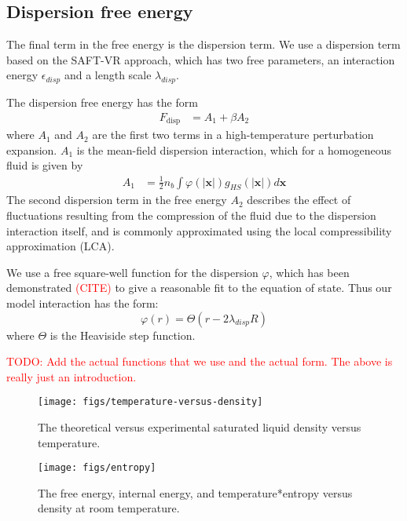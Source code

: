 \documentclass[letterpaper,twocolumn,amsmath,amssymb,prb]{revtex4-1}
\newcommand{\xx}{\textbf{x}}
\begin{document}
\subsection{Dispersion free energy}
The final term in the free energy is the dispersion term.  We use a
dispersion term based on the SAFT-VR
approach\cite{gil-villegas-1997-SAFT-VR}, which has two free
parameters, an interaction energy $\epsilon_\textit{disp}$ and a
length scale $\lambda_\textit{disp}$.

The dispersion free energy has the form~\cite{gil-villegas-1997-SAFT-VR}
\begin{align}
  F_\text{disp} &= A_1 + \beta A_2
\end{align}
where $A_1$ and $A_2$ are the first two terms in a high-temperature
perturbation expansion.  $A_1$ is the mean-field dispersion
interaction, which for a homogeneous fluid is given by
\begin{align}
  A_1 &= \frac12 n_b \int \varphi(\left|\xx\right|)
  g_{HS}(\left|\xx\right|) d\xx
\end{align}
The second dispersion term in the free energy $A_2$ describes the
effect of fluctuations resulting from the compression of the fluid due
to the dispersion interaction itself, and is commonly approximated
using the local compressibility approximation (LCA).

We use a free square-well function for the dispersion $\varphi$, which
has been demonstrated \textcolor{red}{(CITE)} to give a reasonable fit
to the equation of state.  Thus our model interaction has the form:
\begin{equation}
  \varphi(r) = \Theta(r-2 \lambda_\textit{disp} R)
\end{equation}
where $\Theta$ is the Heaviside step function.

\textcolor{red}{TODO:  Add the actual functions that we use and the
  actual form.  The above is really just an introduction.}


\begin{figure}
\begin{center}
\texttt{[image: figs/temperature-versus-density]}
\end{center}
\caption{The theoretical versus experimental saturated liquid density
  versus temperature.  }
\label{fig:saturated-liquid-density}
\end{figure}

\begin{figure}
\begin{center}
\texttt{[image: figs/entropy]}
\end{center}
\caption{The free energy, internal energy, and temperature*entropy versus density at room temperature.  }
\label{fig:energy-room-temp}
\end{figure}
\end{document}
